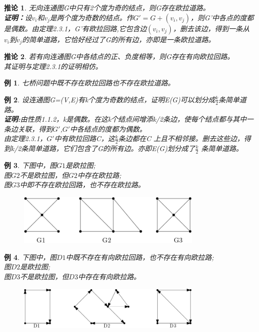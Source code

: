 \documentclass[11pt,a4paper,openany]{book}
\newtheorem{coro}{\textbf{推论}}[section]
\newtheorem{sample}{\textbf{例}}[section]
\begin{document}
\begin{coro}
无向连通图G中只有2个度为奇的结点，则G存在欧拉道路。\\
\textbf{证明：}设$v_i$和$v_j$是两个度为奇数的结点。作$G'=G+(v_i,v_j)$，则G'中各点的度都是偶数。由定理2.3.1，G'有欧拉回路,它包含边$(v_i,v_j)$，删去该边，得到一条从$v_i$到$v_j$的简单道路，它恰好经过了G的所有边，亦即是一条欧拉道路。
\end{coro}
\begin{coro}\K
若有向连通图G中各结点的正、负度相等，则G存在有向欧拉回路。\\
其证明与定理2.3.1的证明相仿。
\end{coro}
\begin{sample}
七桥问题中既不存在欧拉回路也不存在欧拉道路。
\end{sample}
\begin{sample}\K
 设连通图G=(V,E)有k个度为奇数的结点，证明E(G)可以划分成$\frac{k}{2}$条简单道路。\\
 \textbf{证明:}由性质1.1.2，k是偶数。在这k个结点间增添k/2条边，使每个结点都与其中一条边关联，得到$G'$,$G'$中各结点的度都为偶数。\\
 由定理2.3.1，$G'$中有欧拉回路C，这$\frac{k}{2}$条边都在C 上且不相邻接。删去这些边，得到k/2条简单道路，它们包含了G的所有边。亦即E(G)划分成了$\frac{k}{2}$ 条简单道路。\\
 \end{sample}
\begin{sample}\K
下图中，图$G1$是欧拉图;\\
图$G2$不是欧拉图，但$G2$中存在欧拉路;\\
图$G3$中即不存在欧拉回路，也不存在欧拉路。\\
\begin{figure}[h]
  \centering
  \includegraphics[width=0.8\textwidth]{2.f1.png}\\
  \caption*{}
\end{figure}
\end{sample}
\begin{sample}\K
下图中，图$D1$中既不存在有向欧拉回路，也不存在有向欧拉路;\\
图$D2$是欧拉图;\\
图$D3$不是欧拉图，但$D3$中存在有向欧拉路。\\
\begin{figure}[h]
  \centering
  \includegraphics[width=0.8\textwidth]{2.f2.png}\\
  \caption*{}
\end{figure}
\end{sample}
\end{document}
